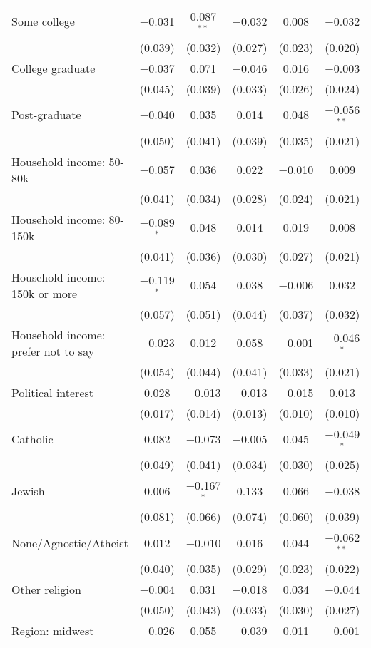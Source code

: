 \begin{tabular}{@{\extracolsep{5pt}}lccccc}
  Some college & $-$0.031 & 0.087$^{**}$ & $-$0.032 & 0.008 & $-$0.032 \\ 
  & (0.039) & (0.032) & (0.027) & (0.023) & (0.020) \\ 
  College graduate & $-$0.037 & 0.071 & $-$0.046 & 0.016 & $-$0.003 \\ 
  & (0.045) & (0.039) & (0.033) & (0.026) & (0.024) \\ 
  Post-graduate & $-$0.040 & 0.035 & 0.014 & 0.048 & $-$0.056$^{**}$ \\ 
  & (0.050) & (0.041) & (0.039) & (0.035) & (0.021) \\ 
  Household income: 50-80k & $-$0.057 & 0.036 & 0.022 & $-$0.010 & 0.009 \\ 
  & (0.041) & (0.034) & (0.028) & (0.024) & (0.021) \\ 
  Household income: 80-150k & $-$0.089$^{*}$ & 0.048 & 0.014 & 0.019 & 0.008 \\ 
  & (0.041) & (0.036) & (0.030) & (0.027) & (0.021) \\ 
  Household income: 150k or more & $-$0.119$^{*}$ & 0.054 & 0.038 & $-$0.006 & 0.032 \\ 
  & (0.057) & (0.051) & (0.044) & (0.037) & (0.032) \\ 
  Household income: prefer not to say & $-$0.023 & 0.012 & 0.058 & $-$0.001 & $-$0.046$^{*}$ \\ 
  & (0.054) & (0.044) & (0.041) & (0.033) & (0.021) \\ 
  Political interest & 0.028 & $-$0.013 & $-$0.013 & $-$0.015 & 0.013 \\ 
  & (0.017) & (0.014) & (0.013) & (0.010) & (0.010) \\ 
  Catholic & 0.082 & $-$0.073 & $-$0.005 & 0.045 & $-$0.049$^{*}$ \\ 
  & (0.049) & (0.041) & (0.034) & (0.030) & (0.025) \\ 
  Jewish & 0.006 & $-$0.167$^{*}$ & 0.133 & 0.066 & $-$0.038 \\ 
  & (0.081) & (0.066) & (0.074) & (0.060) & (0.039) \\ 
  None/Agnostic/Atheist & 0.012 & $-$0.010 & 0.016 & 0.044 & $-$0.062$^{**}$ \\ 
  & (0.040) & (0.035) & (0.029) & (0.023) & (0.022) \\ 
  Other religion & $-$0.004 & 0.031 & $-$0.018 & 0.034 & $-$0.044 \\ 
  & (0.050) & (0.043) & (0.033) & (0.030) & (0.027) \\ 
  Region: midwest & $-$0.026 & 0.055 & $-$0.039 & 0.011 & $-$0.001 \\ 

\end{tabular}
